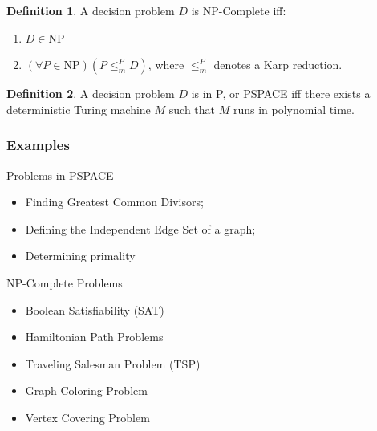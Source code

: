 \documentclass[11pt,letterpaper]{article}
\theoremstyle{definition}
\newtheorem{defn}{Definition}[section]
\begin{document}
\begin{defn}
    A decision problem \(D\) is NP-Complete iff:
    \begin{enumerate}
        \item \(D\in\text{NP}\)
        \item \((\forall P\in\text{NP})(P\leq_m^P D)\), where \(\leq_m^P\) denotes a Karp reduction\autocite{karp_1972}.\autocite{cook_1971}
    \end{enumerate}
\end{defn}

\begin{defn}
    A decision problem \(D\) is in P, or PSPACE iff there exists a deterministic Turing machine \(M\) such that \(M\) runs in polynomial time.\autocite{leeuwen_1994}
\end{defn}
\newpage
\subsubsection{Examples}
\begin{multicols}{2}
    Problems in PSPACE
    \begin{itemize}
        \item Finding Greatest Common Divisors;
        \item Defining the Independent Edge Set of a graph;
        \item Determining primality
    \end{itemize}
    \columnbreak
    NP-Complete Problems
    \begin{itemize}
        \item Boolean Satisfiability (SAT)
        \item Hamiltonian Path Problems
        \item Traveling Salesman Problem (TSP)
        \item Graph Coloring Problem
        \item Vertex Covering Problem
    \end{itemize}
\end{multicols}
\end{document}
